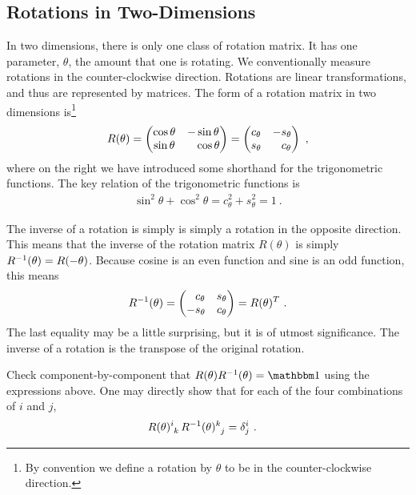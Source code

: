 \documentclass[12pt]{article}
\begin{document}
\subsection{Rotations in Two-Dimensions}

In two dimensions, there is only one class of rotation matrix. It has one parameter, $\theta$, the amount that one is rotating. We conventionally measure rotations in the counter-clockwise direction. Rotations are linear transformations, and thus are represented by matrices. The form of a rotation matrix in two dimensions is\footnote{By convention we define a rotation by $\theta$ to be in the counter-clockwise direction.}
\begin{align}
    R(\theta) = 
    \begin{pmatrix}
        \cos\theta & - \sin\theta \\
        \sin\theta & \pp \cos \theta
    \end{pmatrix}
    =
    \begin{pmatrix}
        c_\theta & - s_\theta \\
        s_\theta & \pp c_\theta
    \end{pmatrix}\ ,
    \label{eq:rotation:matrix:2D}
\end{align}
where on the right we have introduced some shorthand for the trigonometric functions. The key relation of the trigonometric functions is
\begin{align}
    \sin^2\theta + \cos^2\theta = c_\theta^2 + s_\theta^2 = 1 \ .
\end{align}

The inverse of a rotation is simply is simply a rotation in the opposite direction. This means that the inverse of the rotation matrix $R(\theta)$ is simply $R^{-1}(\theta) = R(-\theta)$. Because cosine is an even function and sine is an odd function, this means
\begin{align}
R\inv(\theta) = 
\begin{pmatrix}
        \pp c_\theta &  s_\theta \\
        - s_\theta &  c_\theta
    \end{pmatrix} 
    = 
    R(\theta)^T
    \ .
\end{align}
The last equality may be a little surprising, but it is of utmost significance. The inverse of a rotation is the transpose of the original rotation. 

\begin{exercise}
Check component-by-component that $R(\theta)R\inv(\theta) = \one $ using the expressions above. One may directly show that for each of the four combinations of $i$ and $j$,
\begin{align}
    R(\theta)\aij{i}{k} \, R\inv(\theta)\aij{k}{j} &= \delta^i_j  \ .
\end{align}
\end{exercise}
\end{document}
